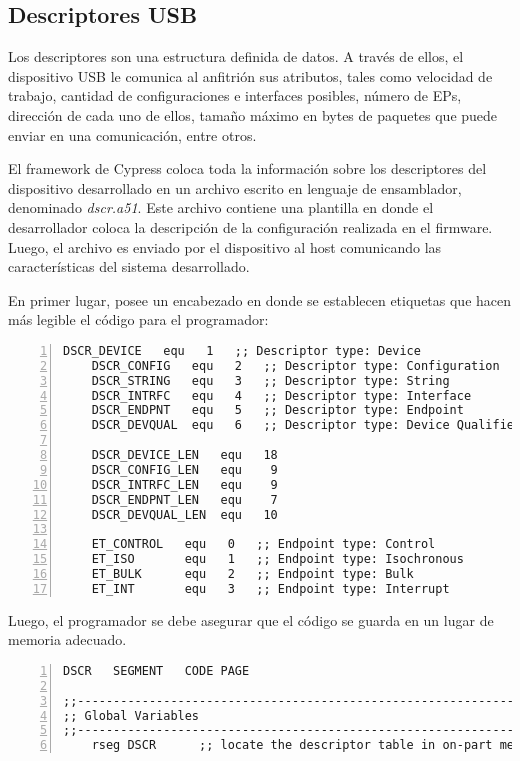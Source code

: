 \subsection{Descriptores USB}	
	Los descriptores son una estructura definida de datos. A través de ellos, el dispositivo USB le comunica al anfitrión sus atributos, tales como velocidad de trabajo, cantidad de configuraciones e interfaces posibles, número de EPs, dirección de cada uno de ellos, tamaño máximo en bytes de paquetes que puede enviar en una comunicación, entre otros.%
	
	El framework de Cypress coloca toda la información sobre los descriptores del dispositivo desarrollado en un archivo escrito en lenguaje de ensamblador, denominado {\it dscr.a51}. Este archivo contiene una plantilla en donde el desarrollador coloca la descripción de la configuración realizada en el firmware. Luego, el archivo es enviado por el dispositivo al host comunicando las características del sistema desarrollado.%
	
	En primer lugar, posee un encabezado en donde se establecen etiquetas que hacen más legible el código para el programador:
	\begin{lstlisting}[language={[x86masm]Assembler},backgroundcolor=\color{gray!30},numbers=left]
	DSCR_DEVICE   equ   1   ;; Descriptor type: Device
	DSCR_CONFIG   equ   2   ;; Descriptor type: Configuration
	DSCR_STRING   equ   3   ;; Descriptor type: String
	DSCR_INTRFC   equ   4   ;; Descriptor type: Interface
	DSCR_ENDPNT   equ   5   ;; Descriptor type: Endpoint
	DSCR_DEVQUAL  equ   6   ;; Descriptor type: Device Qualifier
	
	DSCR_DEVICE_LEN   equ   18
	DSCR_CONFIG_LEN   equ    9
	DSCR_INTRFC_LEN   equ    9
	DSCR_ENDPNT_LEN   equ    7
	DSCR_DEVQUAL_LEN  equ   10
	
	ET_CONTROL   equ   0   ;; Endpoint type: Control
	ET_ISO       equ   1   ;; Endpoint type: Isochronous
	ET_BULK      equ   2   ;; Endpoint type: Bulk
	ET_INT       equ   3   ;; Endpoint type: Interrupt
	\end{lstlisting}

	Luego, el programador se debe asegurar que el código se guarda en un lugar de memoria adecuado.
	
	\begin{lstlisting}[language={[x86masm]Assembler},backgroundcolor=\color{gray!30},numbers=left]
DSCR   SEGMENT   CODE PAGE

;;-----------------------------------------------------------------------------
;; Global Variables
;;-----------------------------------------------------------------------------
	rseg DSCR      ;; locate the descriptor table in on-part memory.
	\end{lstlisting}
	
